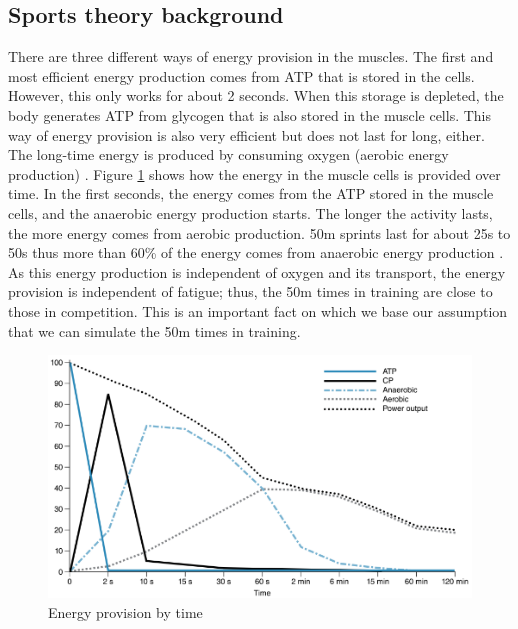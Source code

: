 \subsection{Sports theory background}\label{sec:sport_theory}
There are three different ways of energy provision in the muscles. The first and most efficient energy production comes from ATP that is stored in the cells. However, this only works for about 2 seconds. When this storage is depleted, the body generates ATP from glycogen that is also stored in the muscle cells. This way of energy provision is also very efficient but does not last for long, either. The long-time energy is produced by consuming oxygen (aerobic energy production) \cite{Bompa.2018}. Figure \ref{fig:energy_provision} shows how the energy in
the muscle cells is provided over time.  In the first seconds, the energy comes from the ATP stored in the muscle cells, and the anaerobic energy production starts.  The longer the activity lasts, the more energy comes from aerobic production. 50m sprints last for about 25s to 50s thus more than 60\% of the energy comes from anaerobic energy production \cite{Dr.PatriziaMayerHaralOchwatweitereBSVDozenten.2007} . As this energy production is independent of oxygen and its transport, the energy provision is independent of fatigue; thus, the 50m times in training are close to those in competition. This is an important fact on which we base our assumption that we can simulate the 50m times in training.
\begin{figure}[ht]
    \centering
    \includegraphics[scale=0.5]{visualisation/energy_provision.png}
    \caption{Energy provision by time \cite{Bompa.2018}}
    \label{fig:energy_provision}
\end{figure}
